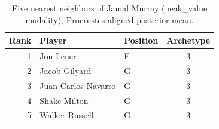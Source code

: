 \begin{table}[htbp]
  \centering\small
  \begin{tabular}{rllc}
    \toprule
    Rank & Player & Position & Archetype \\
    \midrule
    1 & Jon Leuer & F & 3 \\
    2 & Jacob Gilyard & G & 3 \\
    3 & Juan Carlos Navarro & G & 3 \\
    4 & Shake Milton & G & 3 \\
    5 & Walker Russell & G & 3 \\
    \bottomrule
  \end{tabular}
  \caption{Five nearest neighbors of Jamal Murray (peak_value modality), Procrustes-aligned posterior mean.}
  \label{tab:Jamal_Murray_neighbors_peak_value}
\end{table}

